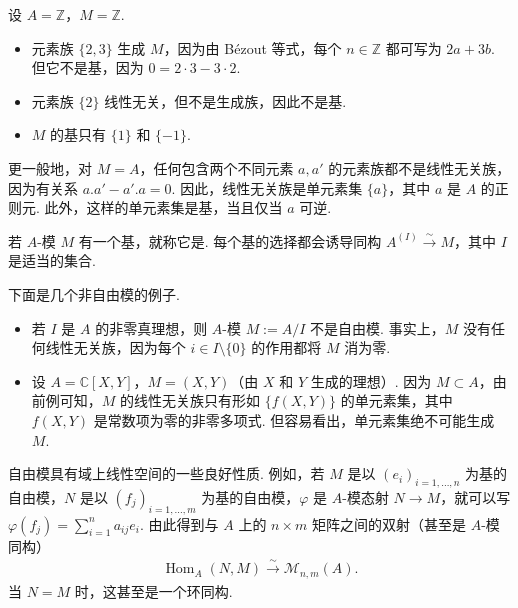 \begin{example*}
设 $A=\mathbb Z$，$M=\mathbb Z$.
\begin{itemize}
\item 元素族 $\{2,3\}$ 生成 $M$，因为由 Bézout 等式，每个 $n\in\mathbb Z$ 都可写为 $2a+3b$. 但它不是基，因为 $0=2\cdot3-3\cdot2$.
\item 元素族 $\{2\}$ 线性无关，但不是生成族，因此不是基.
\item $M$ 的基只有 $\{1\}$ 和 $\{-1\}$.
\end{itemize}
\end{example*}
\begin{example*}
更一般地，对 $M=A$，任何包含两个不同元素 $a,a'$ 的元素族都不是线性无关族，因为有关系 $a.a'-a'.a=0$. 因此，线性无关族是单元素集 $\{a\}$，其中 $a$ 是 $A$ 的正则元. 此外，这样的单元素集是基，当且仅当 $a$ 可逆.
\end{example*}
\begin{definition*}
若 $A$-模 $M$ 有一个基，就称它是. 每个基的选择都会诱导同构 $A^{(I)}\xrightarrow{\sim}M$，其中 $I$ 是适当的集合.
\end{definition*}
\begin{example*}
下面是几个非自由模的例子.
\begin{itemize}
\item 若 $I$ 是 $A$ 的非零真理想，则 $A$-模 $M:=A/I$ 不是自由模. 事实上，$M$ 没有任何线性无关族，因为每个 $i\in I\setminus\{0\}$ 的作用都将 $M$ 消为零.
\item 设 $A=\mathbb C[X,Y]$，$M=(X,Y)$（由 $X$ 和 $Y$ 生成的理想）. 因为 $M\subset A$，由前例可知，$M$ 的线性无关族只有形如 $\{f(X,Y)\}$ 的单元素集，其中 $f(X,Y)$ 是常数项为零的非零多项式. 但容易看出，单元素集绝不可能生成 $M$.
\end{itemize}
\end{example*}
自由模具有域上线性空间的一些良好性质. 例如，若 $M$ 是以 $(e_i)_{i=1,\ldots,n}$ 为基的自由模，$N$ 是以 $(f_j)_{i=1,\ldots,m}$ 为基的自由模，$\varphi$ 是 $A$-模态射 $N\longrightarrow M$，就可以写 $\varphi(f_j)=\sum_{i=1}^n a_{ij}e_i$. 由此得到与 $A$ 上的 $n\times m$ 矩阵之间的双射（甚至是 $A$-模同构）
\begin{align*}
\operatorname{Hom}_A(N,M)\xrightarrow{\sim}\mathcal M_{n,m}(A).
\end{align*}
当 $N=M$ 时，这甚至是一个环同构.

